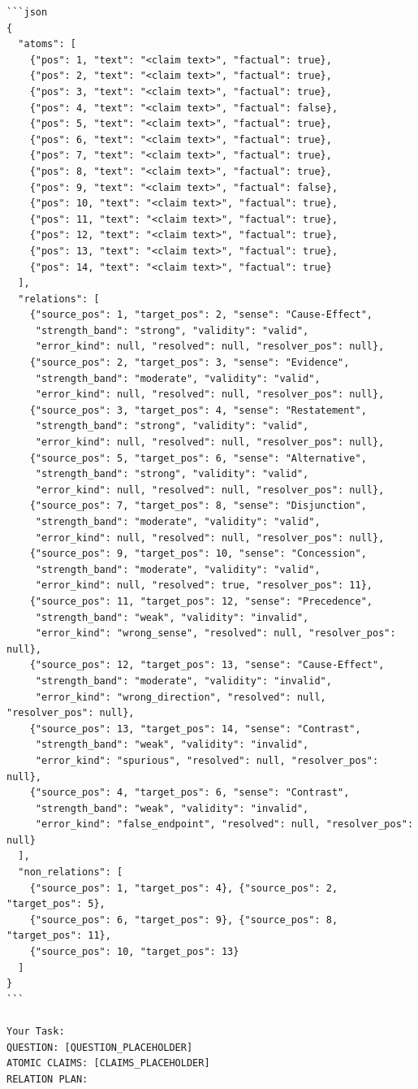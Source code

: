 \documentclass[11pt]{article}
\begin{document}
\begin{small}
\begin{verbatim}
```json
{
  "atoms": [
    {"pos": 1, "text": "<claim text>", "factual": true},
    {"pos": 2, "text": "<claim text>", "factual": true},
    {"pos": 3, "text": "<claim text>", "factual": true},
    {"pos": 4, "text": "<claim text>", "factual": false},
    {"pos": 5, "text": "<claim text>", "factual": true},
    {"pos": 6, "text": "<claim text>", "factual": true},
    {"pos": 7, "text": "<claim text>", "factual": true},
    {"pos": 8, "text": "<claim text>", "factual": true},
    {"pos": 9, "text": "<claim text>", "factual": false},
    {"pos": 10, "text": "<claim text>", "factual": true},
    {"pos": 11, "text": "<claim text>", "factual": true},
    {"pos": 12, "text": "<claim text>", "factual": true},
    {"pos": 13, "text": "<claim text>", "factual": true},
    {"pos": 14, "text": "<claim text>", "factual": true}
  ],
  "relations": [
    {"source_pos": 1, "target_pos": 2, "sense": "Cause-Effect",
     "strength_band": "strong", "validity": "valid",
     "error_kind": null, "resolved": null, "resolver_pos": null},
    {"source_pos": 2, "target_pos": 3, "sense": "Evidence",
     "strength_band": "moderate", "validity": "valid",
     "error_kind": null, "resolved": null, "resolver_pos": null},
    {"source_pos": 3, "target_pos": 4, "sense": "Restatement",
     "strength_band": "strong", "validity": "valid",
     "error_kind": null, "resolved": null, "resolver_pos": null},
    {"source_pos": 5, "target_pos": 6, "sense": "Alternative",
     "strength_band": "strong", "validity": "valid",
     "error_kind": null, "resolved": null, "resolver_pos": null},
    {"source_pos": 7, "target_pos": 8, "sense": "Disjunction",
     "strength_band": "moderate", "validity": "valid",
     "error_kind": null, "resolved": null, "resolver_pos": null},
    {"source_pos": 9, "target_pos": 10, "sense": "Concession",
     "strength_band": "moderate", "validity": "valid",
     "error_kind": null, "resolved": true, "resolver_pos": 11},
    {"source_pos": 11, "target_pos": 12, "sense": "Precedence",
     "strength_band": "weak", "validity": "invalid",
     "error_kind": "wrong_sense", "resolved": null, "resolver_pos": null},
    {"source_pos": 12, "target_pos": 13, "sense": "Cause-Effect",
     "strength_band": "moderate", "validity": "invalid",
     "error_kind": "wrong_direction", "resolved": null, "resolver_pos": null},
    {"source_pos": 13, "target_pos": 14, "sense": "Contrast",
     "strength_band": "weak", "validity": "invalid",
     "error_kind": "spurious", "resolved": null, "resolver_pos": null},
    {"source_pos": 4, "target_pos": 6, "sense": "Contrast",
     "strength_band": "weak", "validity": "invalid",
     "error_kind": "false_endpoint", "resolved": null, "resolver_pos": null}
  ],
  "non_relations": [
    {"source_pos": 1, "target_pos": 4}, {"source_pos": 2, "target_pos": 5},
    {"source_pos": 6, "target_pos": 9}, {"source_pos": 8, "target_pos": 11},
    {"source_pos": 10, "target_pos": 13}
  ]
}
```

Your Task:
QUESTION: [QUESTION_PLACEHOLDER]
ATOMIC CLAIMS: [CLAIMS_PLACEHOLDER]
RELATION PLAN:
\end{verbatim}
\end{small}
\end{document}
